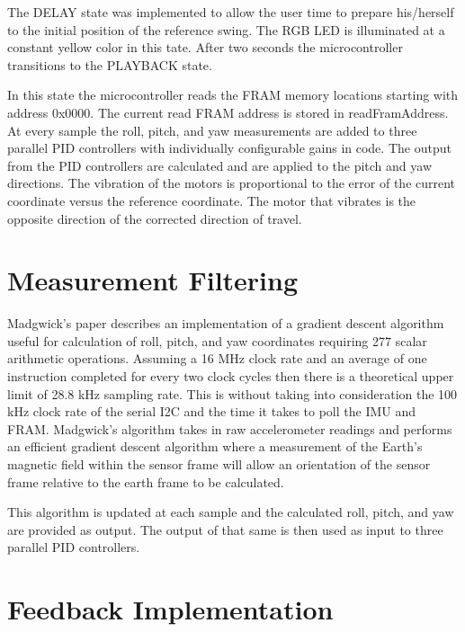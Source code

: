 The DELAY state was implemented to allow the user time to prepare his/herself to the initial position of the reference swing. The RGB LED is illuminated at a constant yellow color in this tate.  After two seconds the microcontroller transitions to the PLAYBACK state.

In this state the microcontroller reads the FRAM memory locations starting with address 0x0000.  The current read FRAM address is stored in readFramAddress.  At every sample the roll, pitch, and yaw measurements are added to three parallel PID controllers with individually configurable gains in code.  The output from the PID controllers are calculated and are applied to the pitch and yaw directions.  The vibration of the motors is proportional to the error of the current coordinate versus the reference coordinate. The motor that vibrates is the opposite direction of the corrected direction of travel.

\section{Measurement Filtering}



Madgwick's paper \cite{imu_filter_madgwick} describes an implementation of a gradient descent algorithm useful for calculation of roll, pitch, and yaw coordinates requiring 277 scalar arithmetic operations.  Assuming a 16 MHz clock rate and an average of one instruction completed for every two clock cycles then there is a theoretical upper limit of 28.8 kHz sampling rate.  This is without taking into consideration the 100 kHz clock rate of the serial I2C and the time it takes to poll the IMU and FRAM.  Madgwick's algorithm takes in raw accelerometer readings and performs an efficient gradient descent algorithm where a measurement of the Earth's magnetic field within the sensor frame will allow an orientation of the sensor frame relative to the earth frame to be calculated.

This algorithm is updated at each sample and the calculated roll, pitch, and yaw are provided as output.  The output of that same is then used as input to three parallel PID controllers.

\section{Feedback Implementation}


